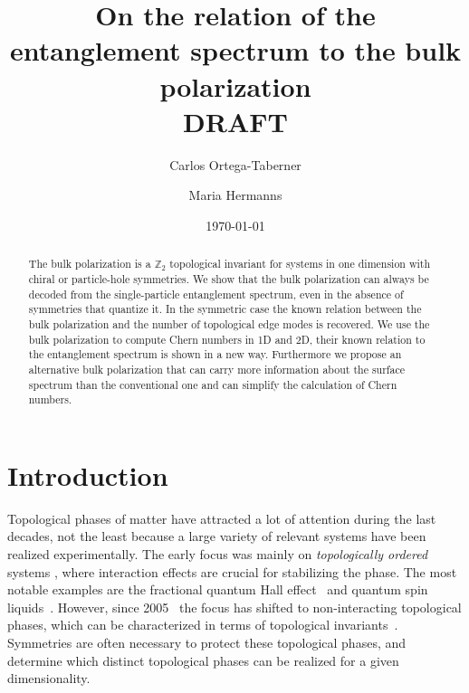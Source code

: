 \documentclass[twocolumn,amsmath,longbibliography,amssymb,superscriptaddress]{revtex4-1}
\begin{document}
		
\title{On the relation of the entanglement spectrum to the bulk polarization \\ DRAFT}
\author{Carlos Ortega-Taberner}

\author{Maria Hermanns}
\date{\today}
\begin{abstract}
The bulk polarization is a $\mathbb{Z}_2$ topological invariant for systems in one dimension with chiral or particle-hole symmetries. We show that the bulk polarization can always be decoded from the single-particle entanglement spectrum, even in the absence of symmetries that quantize it. In the symmetric case the known relation between the bulk polarization and the number of topological edge modes is recovered. We use the bulk polarization to compute Chern numbers in 1D and 2D, their known relation to the entanglement spectrum is shown in a new way. Furthermore we propose an alternative bulk polarization that can carry more information about the surface spectrum than the conventional one and can simplify the calculation of Chern numbers. 
\end{abstract}

\maketitle
	


\section{Introduction}
Topological phases of matter have attracted a lot of attention during the last decades, not the least because a large variety of relevant systems have been realized experimentally. 
The early focus was mainly on \emph{topologically ordered} systems \cite{wenbook}, where interaction effects are crucial for stabilizing the phase. 
The most notable examples are the fractional quantum Hall effect~\cite{Tsui1982} and quantum spin liquids~\cite{Balents2010spin}. 
However, since 2005~\cite{kane2005quantum, roy2009topological} the focus has shifted to non-interacting topological phases, which can be characterized in terms of topological invariants~\cite{ryu2010topological}. 
Symmetries are often necessary to protect these topological phases, and determine which distinct topological phases can be realized for a given dimensionality. 
\end{document}
